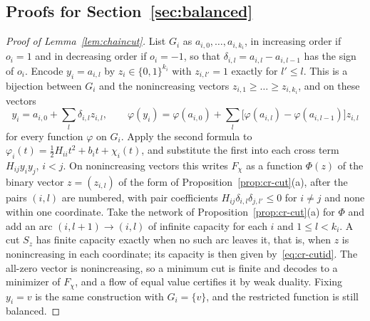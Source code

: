\subsection{Proofs for Section~\ref{sec:balanced}}

\begin{proof}[Proof of Lemma~\ref{lem:chaincut}]
List $G_i$ as $a_{i,0},\dots,a_{i,k_i}$, in increasing order if $o_i=1$ and
in decreasing order if $o_i=-1$, so that $\delta_{i,l}=a_{i,l}-a_{i,l-1}$
has the sign of $o_i$. Encode $y_i=a_{i,l}$ by $z_i\in\{0,1\}^{k_i}$ with
$z_{i,l'}=1$ exactly for $l'\le l$. This is a bijection between $G_i$ and
the nonincreasing vectors $z_{i,1}\ge\dots\ge z_{i,k_i}$, and on these
vectors
\[
y_i=a_{i,0}+\sum_l\delta_{i,l}z_{i,l},\qquad
\varphi(y_i)=\varphi(a_{i,0})
+\sum_l\bigl[\varphi(a_{i,l})-\varphi(a_{i,l-1})\bigr]z_{i,l}
\]
for every function $\varphi$ on $G_i$. Apply the second formula to
$\varphi_i(t)=\frac12H_{ii}t^2+b_it+\chi_i(t)$, and substitute the first into
each cross term $H_{ij}y_iy_j$, $i<j$. On nonincreasing vectors this writes
$F_\chi$ as a function $\Phi(z)$ of the binary vector $z=(z_{i,l})$ of the
form of Proposition~\ref{prop:cr-cut}(a), after the pairs $(i,l)$ are
numbered, with pair coefficients
$H_{ij}\delta_{i,l}\delta_{j,l'}\le0$ for $i\ne j$ and none within one
coordinate. Take the network of Proposition~\ref{prop:cr-cut}(a) for
$\Phi$ and add an arc $(i,l+1)\to(i,l)$ of infinite capacity for each $i$ and
$1\le l<k_i$. A cut $S_z$ has finite capacity exactly when no such arc
leaves it, that is, when $z$ is nonincreasing in each coordinate; its
capacity is then given by~\eqref{eq:cr-cutid}. The all-zero vector is
nonincreasing, so a minimum cut is finite and decodes to a minimizer of
$F_\chi$, and a flow of equal value certifies it by weak duality. Fixing
$y_i=v$ is the same construction with $G_i=\{v\}$, and the restricted
function is still balanced.
\end{proof}

